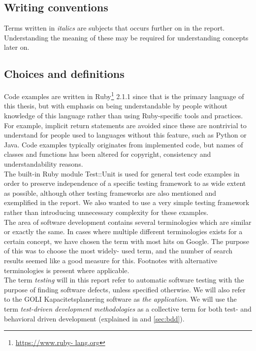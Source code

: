 
\subsection{Writing conventions}

Terms written in \emph{italics} are subjects that occurs further on in
the report. Understanding the meaning of these may be required for
understanding concepts later on.\\


\subsection{Choices and definitions}

Code examples are written in Ruby\footnote{\url{https://www.ruby-
lang.org}} 2.1.1 since that is the primary language of this thesis, but
with emphasis on being understandable by people without knowledge of
this language rather than using Ruby-specific tools and practices. For
example, implicit return statements are avoided since these are
nontrivial to understand for people used to languages without this
feature, such as Python or Java. Code examples typically originates from
implemented code, but names of classes and functions has been altered
for copyright, consistency and understandability reasons.\\

The built-in Ruby module Test::Unit is used for general test code
examples in order to preserve independence of a specific testing
framework to as wide extent as possible, although other testing
frameworks are also mentioned and exemplified in the report. We also
wanted to use a very simple testing framework rather than introducing
unnecessary complexity for these examples.\\

The area of software development contains several terminologies which
are similar or exactly the same. In cases where multiple different
terminologies exists for a certain concept, we have chosen the term with
most hits on Google. The purpose of this was to choose the most widely-
used term, and the number of search results seemed like a good measure
for this. Footnotes with alternative terminologies is present where
applicable.\\

The term \emph{testing} will in this report refer to automatic software
testing with the purpose of finding software defects, unless specified
otherwise. We will also refer to the GOLI Kapacitetsplanering software
as \emph{the application}. We will use the term \emph{test-driven
development methodologies} as a collective term for both test- and
behavioral driven development (explained in  and
\ref{sec:bdd}).\\
